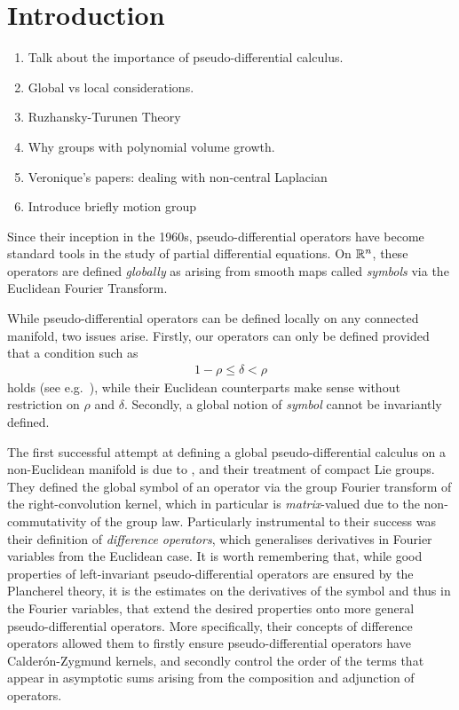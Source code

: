 \chapter{Introduction}

\begin{enumerate}
    \item Talk about the importance of pseudo-differential calculus.
    \item Global vs local considerations.
    \item Ruzhansky-Turunen Theory
    \item Why groups with polynomial volume growth.
    \item Veronique's papers: dealing with non-central Laplacian
    \item Introduce briefly motion group
\end{enumerate}

Since their inception in the 1960s,
pseudo-differential operators have become standard tools in the study of partial differential equations.
On $\mathbb{R}^n$,
these operators are defined \emph{globally} as arising from smooth maps called \emph{symbols} via the Euclidean Fourier Transform.

While pseudo-differential operators can be defined locally on any connected manifold,
two issues arise.
Firstly,
our operators can only be defined provided that a condition such as
\begin{align*}
    1 - \rho \leq \delta < \rho
\end{align*}
holds (see e.g.~\cite[Section 4]{Shubin01}),
while their Euclidean counterparts make sense without restriction on $\rho$ and $\delta$.
Secondly,
a global notion of \emph{symbol} cannot be invariantly defined.

The first successful attempt at defining a global pseudo-differential calculus
on a non-Euclidean manifold is due to \citeauthor{RuzhanskyTurunen10},
and their treatment of compact Lie groups.
They defined the global symbol of an operator via the group Fourier transform of the right-convolution kernel,
which in particular is  \emph{matrix}-valued
due to the non-commutativity of the group law.
Particularly instrumental to their success was their definition of \emph{difference operators},
which generalises derivatives in Fourier variables from the Euclidean case.
It is worth remembering that,
while good properties of left-invariant pseudo-differential operators
are ensured by the Plancherel theory,
it is the estimates on the derivatives of the symbol and thus in the Fourier variables,
that extend the desired properties onto more general pseudo-differential operators.
More specifically,
their concepts of difference operators allowed them to firstly ensure pseudo-differential operators
have Calder\'on-Zygmund kernels,
and secondly control the order of the terms that appear in asymptotic sums
arising from the composition and adjunction of operators.

